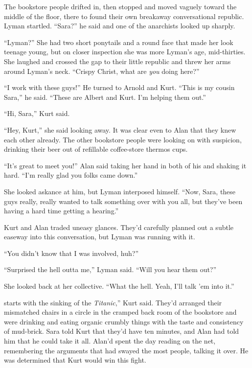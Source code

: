 The bookstore people drifted in, then stopped and moved vaguely toward
the middle of the floor, there to found their own breakaway
conversational republic.  Lyman startled.  ``Sara?'' he said and one
of the anarchists looked up sharply.

``Lyman?'' She had two short ponytails and a round face that made her
look teenage young, but on closer inspection she was more Lyman's age,
mid-thirties.  She laughed and crossed the gap to their little
republic and threw her arms around Lyman's neck.  ``Crispy Christ,
what are \textit{you} doing here?''

``I work with these guys!'' He turned to Arnold and Kurt.  ``This is
my cousin Sara,'' he said.  ``These are Albert and Kurt.  I'm helping
them out.''

``Hi, Sara,'' Kurt said.

``Hey, Kurt,'' she said looking away.  It was clear even to Alan that
they knew each other already.  The other bookstore people were looking
on with suspicion, drinking their beer out of refillable coffee-store
thermos cups.

``It's great to meet you!'' Alan said taking her hand in both of his
and shaking it hard.  ``I'm really glad you folks came down.''

She looked askance at him, but Lyman interposed himself.  ``Now, Sara,
these guys really, really wanted to talk something over with you all,
but they've been having a hard time getting a hearing.''

Kurt and Alan traded uneasy glances.  They'd carefully planned out a
subtle easeway into this conversation, but Lyman was running with it.

``You didn't know that I was involved, huh?''

``Surprised the hell outta me,'' Lyman said.  ``Will you hear them
out?''

She looked back at her collective.  ``What the hell.  Yeah, I'll talk
'em into it.''

starts with the sinking of the \textit{Titanic},'' Kurt said. 
They'd arranged their mismatched chairs in a circle in the cramped
back room of the bookstore and were drinking and eating organic
crumbly things with the taste and consistency of mud-brick.  Sara told
Kurt that they'd have ten minutes, and Alan had told him that he could
take it all.  Alan'd spent the day reading on the net, remembering the
arguments that had swayed the most people, talking it over.  He was
determined that Kurt would win this fight.

